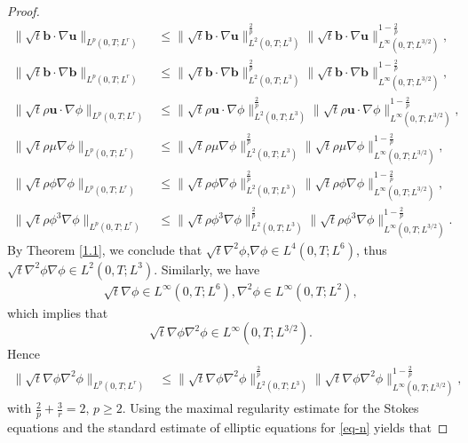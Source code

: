 \documentclass[11pt]{article}
\numberwithin{equation}{section}
\begin{document}
\begin{proof}
\begin{align*}
\|\sqrt{t}\mathbf{b} \cdot \nabla \mathbf{u}\|_{L^p(0,T;L^r)} &\leq \|\sqrt{t} \mathbf{b} \cdot \nabla \mathbf{u}\|_{L^2(0,T;L^3)}^{\frac{2}{p}} \|\sqrt{t} \mathbf{b} \cdot \nabla \mathbf{u}\|_{L^\infty(0,T;L^{3/2})}^{1 - \frac{2}{p}}, \\
\|\sqrt{t}\mathbf{b} \cdot \nabla \mathbf{b}\|_{L^p(0,T;L^r)} &\leq \|\sqrt{t} \mathbf{b} \cdot \nabla \mathbf{b}\|_{L^2(0,T;L^3)}^{\frac{2}{p}} \|\sqrt{t} \mathbf{b} \cdot \nabla \mathbf{b}\|_{L^\infty(0,T;L^{3/2})}^{1 - \frac{2}{p}}, \\
\|\sqrt{t}\rho \mathbf{u} \cdot\nabla \phi\|_{L^p(0,T;L^r)} &\leq \|\sqrt{t}\rho \mathbf{u}\cdot\nabla \phi\|_{L^2(0,T;L^3)}^{\frac{2}{p}} \|\sqrt{t}\rho \mathbf{u} \cdot\nabla \phi\|_{L^\infty(0,T;L^{3/2})}^{1 - \frac{2}{p}},\\
\|\sqrt{t}\rho \mu\nabla \phi\|_{L^p(0,T;L^r)} &\leq \|\sqrt{t}\rho \mu\nabla \phi\|_{L^2(0,T;L^3)}^{\frac{2}{p}} \|\sqrt{t}\rho \mu\nabla \phi\|_{L^\infty(0,T;L^{3/2})}^{1 - \frac{2}{p}},\\
\|\sqrt{t}\rho \phi\nabla \phi\|_{L^p(0,T;L^r)} &\leq \|\sqrt{t}\rho \phi\nabla \phi\|_{L^2(0,T;L^3)}^{\frac{2}{p}} \|\sqrt{t}\rho \phi\nabla \phi\|_{L^\infty(0,T;L^{3/2})}^{1 - \frac{2}{p}},\\
\|\sqrt{t}\rho \phi^3\nabla \phi\|_{L^p(0,T;L^r)} &\leq \|\sqrt{t}\rho \phi^3\nabla \phi\|_{L^2(0,T;L^3)}^{\frac{2}{p}} \|\sqrt{t}\rho \phi^3\nabla \phi\|_{L^\infty(0,T;L^{3/2})}^{1 - \frac{2}{p}}.
\end{align*}
By Theorem  \ref{1.1}, we conclude that
$\sqrt{t}\nabla^2\phi$,$\nabla\phi \in L^4(0, T; L^6)$,
thus
$\sqrt{t}\nabla^2\phi\nabla\phi \in L^2(0, T; L^3)$.
Similarly, we have
\begin{align*}
\sqrt{t}\nabla\phi\in L^\infty(0,T;L^6) ,
\nabla^2\phi\in L^\infty(0,T;L^2),
\end{align*}
which implies that
\begin{equation*}
\sqrt{t}\nabla\phi\nabla^2\phi\in L^\infty(0, T; L^{3/2}).
\end{equation*}
Hence
\begin{align*}
\|\sqrt{t} \nabla \phi\nabla^2\phi\|_{L^p(0,T;L^r)} &\leq \|\sqrt{t} \nabla \phi\nabla^2\phi\|_{L^2(0,T;L^3)}^{\frac{2}{p}} \|\sqrt{t} \nabla \phi\nabla^2\phi\|_{L^\infty(0,T;L^{3/2})}^{1 - \frac{2}{p}},
\end{align*}
with \(\frac{2}{p} + \frac{3}{r} = 2,\, p \geq 2\). Using the maximal regularity estimate for the Stokes equations and the standard estimate of elliptic equations for \eqref{eq-n} yields that

\end{proof}
\end{document}
